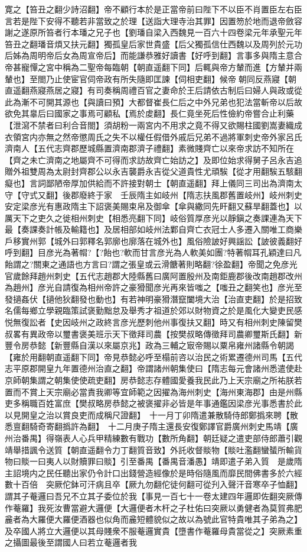寛之【笞丑之翻少詩沼翻】帝不顧行本於是正當帝前曰陛下不以臣不肖置臣左右臣言若是陛下安得不聽若非當致之於理【送詣大理寺治其罪】因置笏於地而退帝斂容謝之遂原所笞者行本璠之兄子也【劉璠自梁入西魏見一百六十四卷梁元年承聖元年笞丑之翻璠音煩又扶元翻】獨孤皇后家世貴盛【后父獨孤信仕西魏以及周列於元功后姊為周明帝后女為周宣帝后】而能謙恭雅好讀書【好呼到翻】言事多與隋主意合帝甚寵憚之宮中稱為二聖帝每臨朝【朝直遥翻下同】后輒與帝方輦而進【方輦并兩輦也】至閤乃止使宦官伺帝政有所失隨即匡諫【伺相吏翻】候帝朝同反燕寢【朝直遥翻燕寢燕居之寢】有司奏稱周禮百官之妻命於王后請依古制后曰婦人與政或從此為漸不可開其源也【與讀曰預】大都督崔長仁后之中外兄弟也犯法當斬帝以后故欲免其辠后曰國家之事焉可顧私【焉於䖍翻】長仁竟坐死后性儉約帝嘗合止利藥【泄瀉不禁者曰利合音閤】須胡粉一兩宮内不用求之竟不得又欲賜柱國劉嵩妻織成衣領宮内亦無之然帝懲周氏之失不以權任假借外戚后兄弟不過將軍刺史帝外家呂氏濟南人【五代志齊郡歷城縣置濟南郡濟子禮翻】素微賤齊亡以來帝求訪不知所在【齊之未亡濟南之地屬齊不可得而求訪故齊亡始訪之】及即位始求得舅子呂永吉追贈外祖雙周為太尉封齊郡公以永吉襲爵永吉從父道貴性尤頑騃【從才用翻騃五駭翻癡也】言詞鄙陋帝厚加供給而不許接對朝士【朝直遥翻】拜上儀同三司出為濟南太守【守式又翻】後郡廢終于家　壬辰隋主如岐州【隋志扶風郡舊置岐州】岐州刺史安定梁彦光有惠政隋主下詔褒美賜束帛及御傘【傘與繖同先盰翻又蘇旱翻蓋也】以厲天下之吏久之徙相州刺史【相悉亮翻下同】岐俗質厚彦光以靜鎭之奏課連為天下最【奏課奏計帳及輸籍也】及居相部如岐州法鄴自齊亡衣冠士人多遷入關唯工商樂戶移實州郭【城外曰郭釋名郭廓也廓落在城外也】風俗險詖好興謡訟【詖彼義翻好呼到翻】目彦光為著㡌?【?飴也?軟而甘言彦光為人軟美如團?特著㡌耳孔穎達曰凡飴謂之?關東之通語也方言曰?謂之張皇或云滑餹著則略翻?徐盈翻】帝聞之免彦光官歲餘拜趙州刺史【五代志趙郡大陸縣舊曰廣阿置殷州及南鉅鹿郡後改南趙郡改州為趙州】彦光自請復為相州帝許之豪猾聞彦光再來皆嗤之【嗤丑之翻笑也】彦光至發擿姦伏【擿他狄翻發也動也】有若神明豪猾潛竄闔境大治【治直吏翻】於是招致名儒每鄉立學親臨策試褒勤黜怠及舉秀才祖道於郊以財物資之於是風化大變吏民感悦無復訟者【史因岐州之政終言彦光歷刺他州事復扶又翻】時又有相州刺史陳留樊叔畧有異政帝以璽書褒美班示天下徵拜司農【按樊叔略傳徵拜司農卿璽斯氏翻】新豐令房恭懿【新豐縣自漢以來屬京兆】政為三輔之㝡帝賜以粟帛雍州諸縣令朝謁【雍於用翻朝直遥翻下同】帝見恭懿必呼至榻前咨以治民之術累遷德州司馬【五代志平原郡開皇九年置德州治直之翻】帝謂諸州朝集使曰【隋志每元會諸州悉遣使赴京師朝集謂之朝集使使疏吏翻】房恭懿志存體國愛養我民此乃上天宗廟之所祐朕若置而不賞上天宗廟必當責我卿等宜師範之因擢為海州刺史【海州東海郡】由是州縣吏多稱職百姓富庶【樊叔略房恭懿之被褒擢非必皆是年事通鑑因梁彦光事悉書於此以見開皇之治以賞良吏而成稱尺證翻】　十一月丁卯隋遣兼散騎侍郎鄭撝來聘【散悉亶翻騎奇寄翻撝許為翻】　十二月庚子隋主還長安復鄭譯官爵廣州刺史馬靖【廣州治番禺】得嶺表人心兵甲精練數有戰功【數所角翻】朝廷疑之遣吏部侍郎蕭引觀靖舉措諷令送質【朝直遥翻令力丁翻質音致】外託收督賧物【賧吐濫翻蠻蜑所輸貨物曰賧一曰夷人以財贖罪曰賧】引至番禺【番禺音潘愚】靖即遣子弟入質　是歲隋主詔境内之民任聽出家仍令計口出錢營造經像於是時俗隨風而靡民間佛書多於六經數十百倍　突厥佗鉢可汗病且卒【厥九勿翻佗徒何翻可從刋入聲汗音寒卒子恤翻】謂其子菴邏曰吾兄不立其子委位於我【事見一百七十一卷太建四年邏即佐翻突厥傳作菴羅】我死汝曹當避大邏便【大邏便者木杆之子杜佑曰突厥以勇健者為莫賀弗肥麄者為大羅便大羅便酒器也似角而麄短體貌似之故以為號此官特貴唯其子弟為之】及卒國人將立大邏便以其母賤衆不服菴邏實貴【墮書作菴羅母貴當從之】突厥素重之攝圖最後至謂國人曰若立菴邏者我